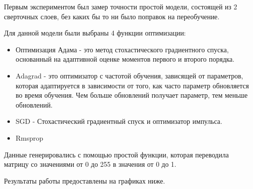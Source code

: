 Первым экспериментом был замер точности простой модели, состоящей из 2 сверточных слоев, без каких бы то ни было поправок на переобучение.

\begin{figure}[H]
\end{figure}

Для данной модели были выбраны 4 функции оптимизации:


\begin{itemize}
	\item Оптимизация Адама - это метод стохастического градиентного спуска, основанный на адаптивной оценке моментов первого и второго порядка.
	\item Adagrad - это оптимизатор с частотой обучения, зависящей от параметров, которая адаптируется в зависимости от того, как часто параметр обновляется во время обучения. Чем больше обновлений получает параметр, тем меньше обновлений.
	\item SGD - Стохастический градиентный спуск и оптимизатор импульса.
	\item Rmsprop
\end{itemize}

Данные генерировались с помощью простой функции, которая переводила матрицу со значениями от 0 до 255 в значения от 0 до 1.

Результаты работы предоставлены на графиках ниже.

\begin{figure}[H]
\end{figure}

